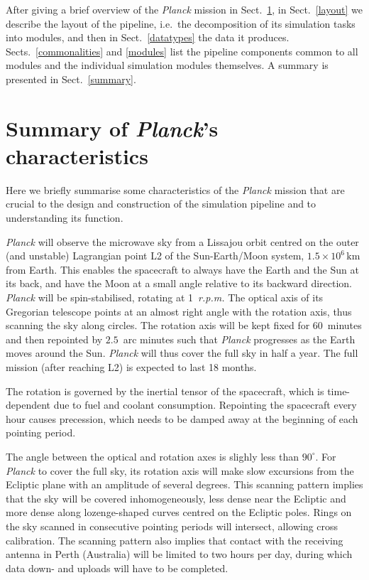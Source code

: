 \documentclass{aa}
\begin{document}
After giving a brief overview of the \emph{Planck} mission in
Sect.~\ref{overview}, in Sect.~\ref{layout} we describe the layout of the
pipeline, i.e.\ the
decomposition of its simulation tasks into modules, and then in
Sect.~\ref{datatypes} the data it produces.
Sects.~\ref{commonalities} and \ref{modules} list
the pipeline components common to all modules and the individual simulation
modules themselves. A summary is presented in Sect.~\ref{summary}.


\section{Summary of \emph{Planck}'s characteristics}
\label{overview}

Here we briefly summarise some characteristics of the \emph{Planck}
mission that are crucial to the design and construction of
the simulation pipeline and to understanding its function.

\emph{Planck} will observe the microwave sky from a Lissajou orbit
centred on the outer (and unstable) Lagrangian point L2 of the
Sun-Earth/Moon system, $1.5\times10^6\,\mathrm{km}$ from Earth. This
enables the spacecraft to always have the Earth and the Sun at its
back, and have the Moon at a small angle relative to its backward
direction. \emph{Planck} will be spin-stabilised, rotating at
1~\emph{r.p.m.} The optical axis of its Gregorian telescope points at
an almost right angle with the rotation axis, thus scanning the sky
along circles. The rotation axis will be kept fixed for 60~minutes
and then repointed by $2.5$~arc minutes such that
\emph{Planck} progresses as the Earth moves around the
Sun. \emph{Planck} will thus cover the full sky in half a year.
The full mission (after reaching L2) is expected to last 18 months.

The rotation is governed by the inertial tensor of the spacecraft,
which is time-dependent due to fuel and coolant
consumption. Repointing the spacecraft every hour causes precession,
which needs to be damped away at the beginning of each pointing
period.

The angle between the optical and rotation axes is slighly less than
$90^\circ$. For \emph{Planck} to cover the full sky, its rotation axis
will make slow excursions from the Ecliptic plane with an
amplitude of several degrees. This scanning pattern implies that the sky
will be covered inhomogeneously, less dense near the Ecliptic and
more dense along lozenge-shaped curves centred on the Ecliptic
poles. Rings on the sky scanned in consecutive pointing periods will
intersect, allowing cross calibration. The scanning pattern also
implies that contact with the receiving antenna in Perth (Australia)
will be limited to two hours per day, during which data down- and
uploads will have to be completed.
\end{document}
